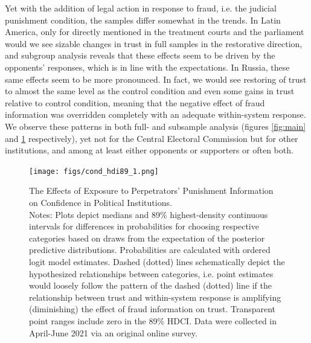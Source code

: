 \documentclass[11pt, ngerman,english,a4]{article}
\begin{document}
Yet with the addition of legal action in response to fraud, i.e. the judicial punishment condition, the samples differ somewhat in the trends.
In Latin America, only for directly mentioned in the treatment courts and the parliament would we see sizable changes in trust in full samples in the restorative direction, and subgroup analysis reveals that these effects seem to be driven by the opponents' responses, which is in line with the expectations.  
In Russia, these same effects seem to be more pronounced.
In fact, we would see restoring of trust to almost the same level as the control condition and even some gains in trust relative to control condition, meaning that the negative effect of fraud information was overridden completely with an adequate within-system response. We observe these patterns in both full- and subsample analysis (figures \ref{fig:main} and \ref{fig:het} respectively), yet not for the Central Electoral Commission but for other institutions, and among at least either opponents or supporters or often both. 


\begin{figure}
	\centering
	\texttt{[image: figs/cond\_hdi89\_1.png]}
	\caption{The Effects of Exposure to Perpetrators' Punishment Information on Confidence in Political Institutions.  \\
		\footnotesize{Notes: Plots depict medians and 89\% highest-density continuous intervals for differences in probabilities for choosing respective categories based on draws from the expectation of the posterior predictive distributions. Probabilities are calculated with ordered logit model estimates.
			Dashed (dotted) lines schematically depict the hypothesized relationships between categories, i.e. point estimates would loosely follow the pattern of the dashed (dotted) line if the relationship between trust and within-system response is amplifying (diminishing) the effect of fraud information on trust. Transparent point ranges include zero in the 89\% HDCI.
	Data were collected in April-June 2021 via an original online survey. } }
	\label{fig:het}
\end{figure}
\end{document}
